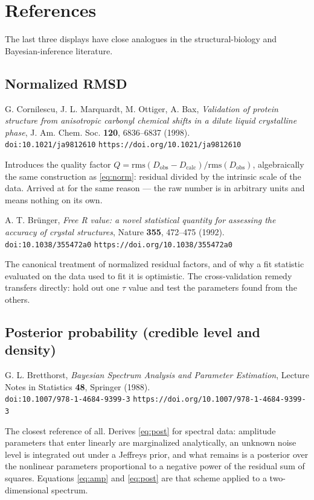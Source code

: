 \documentclass[11pt,a4paper]{article}
\begin{document}
\section{References}

The last three displays have close analogues in the structural-biology and
Bayesian-inference literature.

\subsection*{Normalized RMSD}

G. Cornilescu, J. L. Marquardt, M. Ottiger, A. Bax,
\emph{Validation of protein structure from anisotropic carbonyl chemical
shifts in a dilute liquid crystalline phase}, J. Am. Chem. Soc.
\textbf{120}, 6836--6837 (1998). \\
\texttt{doi:10.1021/ja9812610} \quad \texttt{https://doi.org/10.1021/ja9812610}

Introduces the quality factor
$Q=\mathrm{rms}(D_{\mathrm{obs}}-D_{\mathrm{calc}})/\mathrm{rms}(D_{\mathrm{obs}})$,
algebraically the same construction as \eqref{eq:norm}: residual divided by
the intrinsic scale of the data. Arrived at for the same reason --- the raw
number is in arbitrary units and means nothing on its own.

A. T. Br\"unger, \emph{Free R value: a novel statistical quantity for
assessing the accuracy of crystal structures}, Nature \textbf{355},
472--475 (1992). \\
\texttt{doi:10.1038/355472a0} \quad \texttt{https://doi.org/10.1038/355472a0}

The canonical treatment of normalized residual factors, and of why a fit
statistic evaluated on the data used to fit it is optimistic. The
cross-validation remedy transfers directly: hold out one $\tau$ value and
test the parameters found from the others.

\subsection*{Posterior probability (credible level and density)}

G. L. Bretthorst, \emph{Bayesian Spectrum Analysis and Parameter
Estimation}, Lecture Notes in Statistics \textbf{48}, Springer (1988). \\
\texttt{doi:10.1007/978-1-4684-9399-3} \quad
\texttt{https://doi.org/10.1007/978-1-4684-9399-3}

The closest reference of all. Derives \eqref{eq:post} for spectral data:
amplitude parameters that enter linearly are marginalized analytically, an
unknown noise level is integrated out under a Jeffreys prior, and what
remains is a posterior over the nonlinear parameters proportional to a
negative power of the residual sum of squares. Equations \eqref{eq:amp} and
\eqref{eq:post} are that scheme applied to a two-dimensional spectrum.
\end{document}
